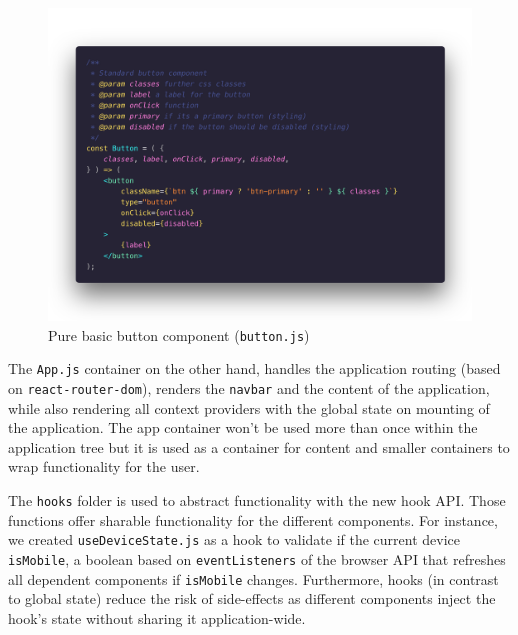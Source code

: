 \begin{figure}[!ht]
	\captionsetup{justification=centering}
	\centering
		\includegraphics[scale=0.28]{Ressourcen/img/code/button.png}
		\vspace{-3em}
		\caption{Pure basic button component (\texttt{button.js})}
		\label{fig:button}
\end{figure}

The \texttt{App.js} container on the other hand, handles the application routing (based on \texttt{react-router-dom}), renders the \texttt{navbar} and the content of the application, while also rendering all context providers with the global state on mounting of the application. The app container won’t be used more than once within the application tree but it is used as a container for content and smaller containers to wrap functionality for the user. 

The \texttt{hooks} folder is used to abstract functionality with the new hook API. Those functions offer sharable functionality for the different components. For instance, we created \texttt{useDeviceState.js} as a hook to validate if the current device \texttt{isMobile}, a boolean based on \texttt{eventListeners} of the browser API that refreshes all dependent components if \texttt{isMobile} changes. Furthermore, hooks (in contrast to global state) reduce the risk of side-effects as different components inject the hook's state without sharing it application-wide. 

